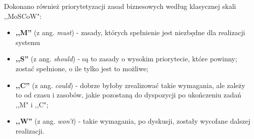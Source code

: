 Dokonano
również priorytetyzacji zasad biznesowych według klasycznej skali ,,MoSCoW":

\begin{itemize}
	\item \textbf{,,M''} (z ang. \textit{must}) - zasady, których spełnienie jest niezbędne dla realizacji systemu
	\item \textbf{,,S''} (z ang. \textit{should}) - są to zasady o wysokim priorytecie, które powinny;
	zostać spełnione, o ile tylko jest to możliwe;
	\item \textbf{,,C''} (z ang. \textit{could}) - dobrze byłoby zrealizować takie wymagania, ale zależy to od czasu
	i zasobów, jakie pozostaną do dyspozycji po ukończeniu zadań ,,M" i ,,C";
	\item \textbf{,,W''} (z ang. \textit{won't}) - takie wymagania, po dyskusji, zostały wycofane dalszej realizacji.
\end{itemize}



